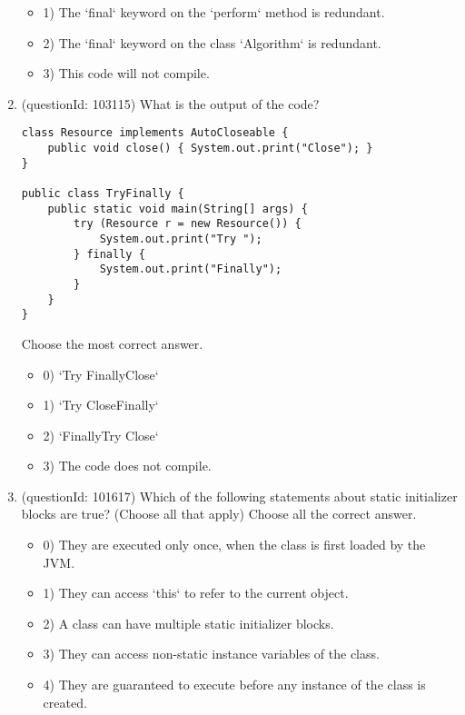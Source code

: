 \documentclass[12pt]{article}
\begin{document}
\begin{enumerate}[label=(\arabic*)]
\begin{itemize}
\item 1) The `final` keyword on the `perform` method is redundant.

\item 2) The `final` keyword on the class `Algorithm` is redundant.

\item 3) This code will not compile.

\end{itemize}
\item (questionId: 103115) What is the output of the code?
\begin{verbatim}
class Resource implements AutoCloseable {
    public void close() { System.out.print("Close"); }
}

public class TryFinally {
    public static void main(String[] args) {
        try (Resource r = new Resource()) {
            System.out.print("Try ");
        } finally {
            System.out.print("Finally");
        }
    }
}
\end{verbatim}
Choose the most correct answer. 
\begin{itemize}
\item 0) `Try FinallyClose`

\item 1) `Try CloseFinally`

\item 2) `FinallyTry Close`

\item 3) The code does not compile.

\end{itemize}
\item (questionId: 101617) Which of the following statements about static initializer blocks are true? (Choose all that apply)
Choose all the correct answer.\begin{itemize}
\item 0) They are executed only once, when the class is first loaded by the JVM.

\item 1) They can access `this` to refer to the current object.

\item 2) A class can have multiple static initializer blocks.

\item 3) They can access non-static instance variables of the class.

\item 4) They are guaranteed to execute before any instance of the class is created.


\end{itemize}
\end{enumerate}
\end{document}
